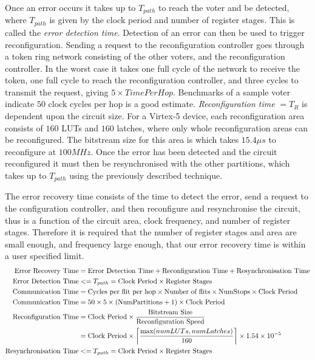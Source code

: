 \documentclass[12pt,final,oneside]{dwThesis} %
\begin{document}
Once an error occurs it takes up to $T_{path}$ to reach the voter and be detected, where $T_{path}$ is given by the clock period and number of register stages. This is called the \emph{error detection time}. Detection of an error can then be used to trigger reconfiguration.
Sending a request to the reconfiguration controller goes through a token ring network consisting of the other voters, and the reconfiguration controller. In the worst case it takes one full cycle of the network to receive the token, one full cycle to reach the reconfiguration controller, and three cycles to transmit the request, giving $5\times TimePerHop$. Benchmarks of a sample voter indicate $50$ clock cycles per hop is a good estimate.
\emph{Reconfiguration time} $= T_R$ is dependent upon the circuit size. For a Virtex-5 device, each reconfiguration area consists of $160$ \acp{LUT} and $160$ latches, where only whole reconfiguration areas can be reconfigured. The bitstream size for this area is  which takes $15.4\mu{}s$ to reconfigure at $100MHz$.
Once the error has been detected and the circuit reconfigured it must then be resynchronised with the other partitions, which takes up to $T_{path}$ using the previously described technique.

The error recovery time consists of the time to detect the error, send a request to the configuration controller, and then reconfigure and resynchronise the circuit, thus is a function of the circuit area, clock frequency, and number of register stages. Therefore it is required that the number of register stages and area are small enough, and frequency large enough, that our error recovery time is within a user specified limit.
\begin{align}
    \mbox{Error Recovery Time} &=\mbox{Error Detection Time} + \mbox{Reconfiguration Time} + \mbox{Resynchronisation Time}\notag\\
    \mbox{Error Detection Time} &<= T_{path} = \mbox{Clock Period}\times\mbox{Register Stages}\notag\\
    \mbox{Communication Time} &= \mbox{Cycles per flit per hop}\times\mbox{Number of flits}\times\mbox{NumStops}\times \mbox{Clock Period}\notag\\
    \mbox{Communication Time} &= 50\times 5\times (\mbox{NumPartitions}+1)\times \mbox{Clock Period}\notag\\
    \mbox{Reconfiguration Time} &= \mbox{Clock Period}\times \frac{\mbox{Bitstream Size}}{\mbox{Reconfiguration Speed}}\notag\\
    &= \mbox{Clock Period}\times \left\lceil \frac{\mbox{max}(numLUTs, numLatches)}{160}\right\rceil\times 1.54\times10^{-5}\notag\\
    \mbox{Resynchronisation Time} &<= T_{path} = \mbox{Clock Period}\times\mbox{Register Stages}\notag\\
\end{align}\cite{DiesselChange}
\end{document}
